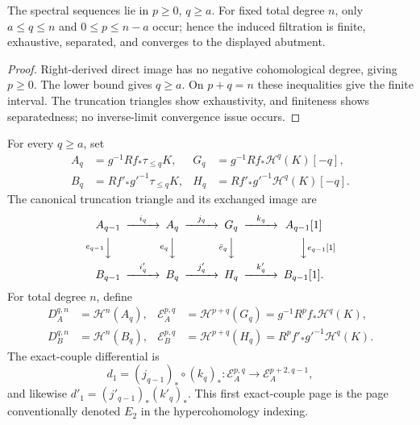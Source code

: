 \begin{lemma}
\label{lemma:weil-pbc-hypercohomology-convergence}
The spectral sequences lie in $p\geq0$, $q\geq a$.  For fixed total degree
$n$, only $a\leq q\leq n$ and $0\leq p\leq n-a$ occur; hence the induced
filtration is finite, exhaustive, separated, and converges to the displayed
abutment.
\end{lemma}
\begin{proof}
Right-derived direct image has no negative cohomological degree, giving
$p\geq0$.  The lower bound gives $q\geq a$.  On $p+q=n$ these inequalities
give the finite interval.  The truncation triangles show exhaustivity, and
finiteness shows separatedness; no inverse-limit convergence issue occurs.
\end{proof}

\begin{definition}
\label{def:weil-pbc-truncation-exact-couples}
For every $q\geq a$, set
\[
\begin{aligned}
A_q&=g^{-1}Rf_*\tau_{\leq q}K,&
G_q&=g^{-1}Rf_*\mathcal H^q(K)[-q],\\
B_q&=Rf'_*g'^{-1}\tau_{\leq q}K,&
H_q&=Rf'_*g'^{-1}\mathcal H^q(K)[-q].
\end{aligned}
\]
The canonical truncation triangle and its exchanged image are
\[
\begin{CD}
A_{q-1}@>{i_q}>>A_q@>{j_q}>>G_q@>{k_q}>>A_{q-1}[1]\\
@V{e_{q-1}}VV@V{e_q}VV@V{\bar e_q}VV@VV{e_{q-1}[1]}V\\
B_{q-1}@>{i'_q}>>B_q@>{j'_q}>>H_q@>{k'_q}>>B_{q-1}[1].
\end{CD}
\]
For total degree $n$, define
\[
\begin{aligned}
D_A^{q,n}&=\mathcal H^n(A_q),&
\mathcal E_A^{p,q}&=\mathcal H^{p+q}(G_q)
 =g^{-1}R^pf_*\mathcal H^q(K),\\
D_B^{q,n}&=\mathcal H^n(B_q),&
\mathcal E_B^{p,q}&=\mathcal H^{p+q}(H_q)
 =R^pf'_*g'^{-1}\mathcal H^q(K).
\end{aligned}
\]
The exact-couple differential is
\[
d_1=(j_{q-1})_*\circ(k_q)_*:
\mathcal E_A^{p,q}\longrightarrow\mathcal E_A^{p+2,q-1},
\]
and likewise $d'_1=(j'_{q-1})_*(k'_q)_*$.  This first
exact-couple page is the page conventionally denoted $E_2$ in the
hypercohomology indexing.
\end{definition}


